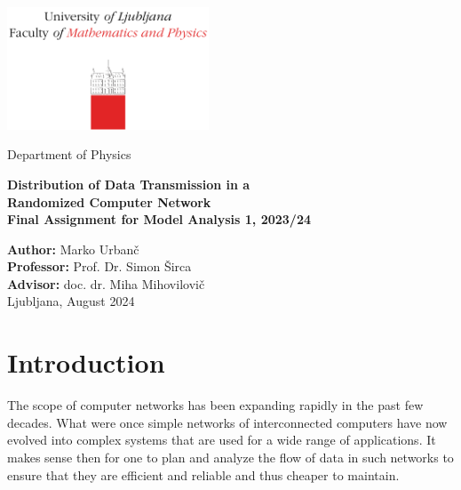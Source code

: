 \documentclass[10pt, titlepage, a4paper]{article}
\begin{document}
\begin{titlepage}
{\centering
\includegraphics[width=6cm]{logo_fmf.pdf}

\vspace{0.8cm}
{\small Department of Physics}

\vspace{5cm}
\vspace{0.5cm}
{\huge\textbf{Distribution of Data Transmission in a}} \\
\vspace{0.2cm}
{\huge\textbf{Randomized Computer Network}} \\
\vspace{0.5cm}
{\large\textbf{Final Assignment for Model Analysis 1, 2023/24}}

\vfill
\textbf{Author:} Marko Urbanč \\
\textbf{Professor:} Prof. Dr. Simon Širca \\ 
\textbf{Advisor:}  doc. dr. Miha Mihovilovič \\

\vspace{1cm}
Ljubljana, August 2024 \\
}
\vspace{3cm}
\end{titlepage}

\hypersetup{pageanchor=true}
\setcounter{page}{2}
\tableofcontents
\vspace{1cm}


\section{Introduction}
The scope of computer networks has been expanding rapidly in the past few decades. What were once simple 
networks of interconnected computers have now evolved into complex systems that are used for a wide range of
applications. It makes sense then for one to plan and analyze the flow of data in such networks to ensure that
they are efficient and reliable and thus cheaper to maintain. \\
\end{document}
